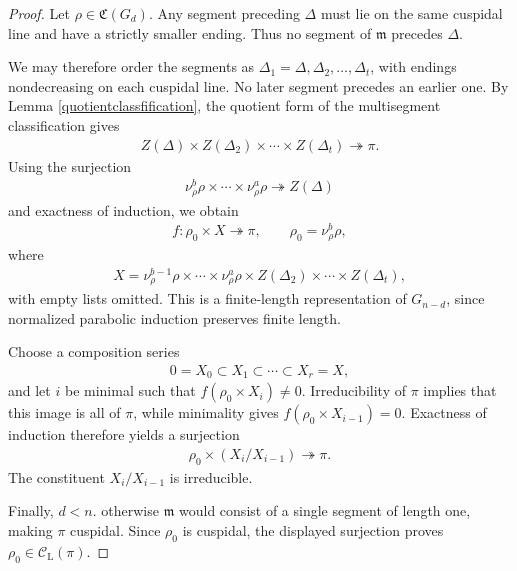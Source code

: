 \documentclass[11pt,leqno]{amsart}
\numberwithin{equation}{section}
\theoremstyle{plain}
\theoremstyle{definition}
\theoremstyle{remark}
\newcommand{\cl}{\mathcal{C}_{\mathrm{L}}}
\begin{document}
	\begin{proof}
		Let $\rho\in \mathfrak{C}(G_d)$.
		Any segment preceding $\Delta$ must lie on the same cuspidal
		line and have a strictly smaller ending. 
		Thus no segment of $\mathfrak m$ precedes $\Delta$.
		
		We may therefore order the segments as
		$\Delta_1=\Delta,\Delta_2,\ldots,\Delta_t$, with endings nondecreasing on each cuspidal line. 
		No later segment precedes an earlier one. 
		By Lemma \ref{quotientclassfification}, the quotient form of the multisegment classification gives
		\begin{align*}
			Z(\Delta)\times Z(\Delta_2)\times\cdots\times Z(\Delta_t)
			\twoheadrightarrow\pi.
		\end{align*}
		Using the surjection
		\begin{align*}
			\nu_\rho^b\rho\times\cdots\times\nu_\rho^a\rho
			\twoheadrightarrow Z(\Delta)
		\end{align*}
		and exactness of induction, we obtain
		\begin{align*}
			f:\rho_0\times X\twoheadrightarrow\pi,
			\qquad \rho_0=\nu_\rho^b\rho,
		\end{align*}
		where
		\begin{align*}
			X=
			\nu_\rho^{b-1}\rho\times\cdots\times\nu_\rho^a\rho
			\times Z(\Delta_2)\times\cdots\times Z(\Delta_t),
		\end{align*}
		with empty lists omitted. This is a finite-length representation
		of $G_{n-d}$, since normalized parabolic induction preserves
		finite length.
		
		Choose a composition series
		\begin{align*}
			0=X_0\subset X_1\subset\cdots\subset X_r=X,
		\end{align*}
		and let $i$ be minimal such that
		$f(\rho_0\times X_i)\neq0$.
		Irreducibility of $\pi$ implies that this image is all of
		$\pi$, while minimality gives
		$f(\rho_0\times X_{i-1})=0$.
		Exactness of induction therefore yields a surjection
		\begin{align*}
			\rho_0\times(X_i/X_{i-1})\twoheadrightarrow\pi.
		\end{align*}
		The constituent $X_i/X_{i-1}$ is irreducible.
		
		Finally, $d<n$. otherwise $\mathfrak m$ would consist of a
		single segment of length one, making $\pi$ cuspidal.
		Since $\rho_0$ is cuspidal, the displayed surjection
		proves $\rho_0\in\cl(\pi)$.
	\end{proof}
	
\end{document}
